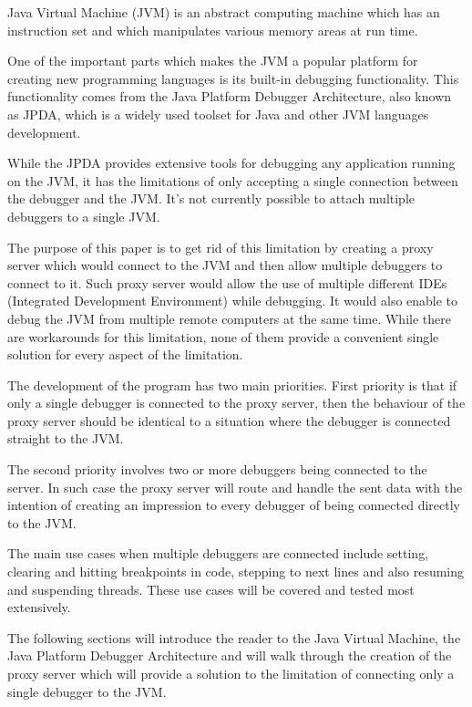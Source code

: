 \documentclass[..thesis.tex]{subfiles}
\begin{document}

Java Virtual Machine (JVM) is an abstract computing machine which has an instruction set and which manipulates various memory areas at run time.\cite{oracle_jvm_spec}

One of the important parts which makes the JVM a popular platform for creating new programming languages is its built-in debugging functionality. 
This functionality comes from the Java Platform Debugger Architecture, also known as JPDA, which is a widely used toolset for Java and other JVM languages development.

While the JPDA provides extensive tools for debugging any application running on the JVM, it has the limitations of only accepting a single connection between the debugger and the JVM. 
It's not currently possible to attach multiple debuggers to a single JVM.


The purpose of this paper is to get rid of this limitation by creating a proxy server which would connect to the JVM and then allow multiple debuggers to connect to it. 
Such proxy server would allow the use of multiple different IDEs (Integrated Development Environment) while debugging. 
It would also enable to debug the JVM from multiple remote computers at the same time. 
While there are workarounds for this limitation, none of them provide a convenient single solution for every aspect of the limitation. 


The development of the program has two main priorities. 
First priority is that if only a single debugger is connected to the proxy server, then the behaviour of the proxy server should be identical to a situation where the debugger is connected straight to the JVM.

The second priority involves two or more debuggers being connected to the server. 
In such case the proxy server will route and handle the sent data with the intention of creating an impression to every debugger of being connected directly to the JVM.

The main use cases when multiple debuggers are connected include setting, clearing and hitting breakpoints in code, stepping to next lines and also resuming and suspending threads.
These use cases will be covered and tested most extensively.

The following sections will introduce the reader to the Java Virtual Machine, the Java Platform Debugger Architecture and will walk through the creation of the proxy server which will provide a solution to the limitation of connecting only a single debugger to the JVM.
\end{document}

